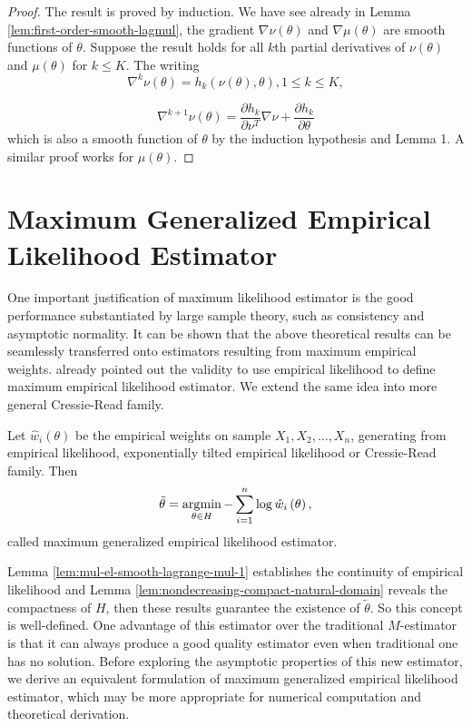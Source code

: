 \begin{proof}
The result is proved by induction. We have see already in Lemma \ref{lem:first-order-smooth-lagmul},
the gradient $\nabla\nu\left(\theta\right)$ and $\nabla\mu\left(\theta\right)$
are smooth functions of $\theta$. Suppose the result holds for all
$k$th partial derivatives of $\nu\left(\theta\right)$ and $\mu\left(\theta\right)$
for $k\le K$. The writing 
\[
\nabla^{k}\nu\left(\theta\right)=h_{k}\left(\nu\left(\theta\right),\theta\right),1\le k\le K,
\]
 
\[
\nabla^{k+1}\nu\left(\theta\right)=\frac{\partial h_{k}}{\partial\nu^{T}}\nabla\nu+\frac{\partial h_{k}}{\partial\theta}
\]
which is also a smooth function of $\theta$ by the induction hypothesis
and Lemma 1. A similar proof works for $\mu\left(\theta\right)$.
\end{proof}

\section{Maximum Generalized Empirical Likelihood Estimator}

One important justification of maximum likelihood estimator is the
good performance substantiated by large sample theory, such as consistency
and asymptotic normality. It can be shown that the above theoretical results
can be seamlessly transferred onto estimators resulting from maximum
empirical weights. \citet{qin1994empirical} already pointed out the
validity to use empirical likelihood to define maximum empirical likelihood
estimator. We extend the same idea into more general Cressie-Read
family. 
\begin{defn}
\label{def:gmele}Let $\hat{w}_{i}\left(\theta\right)$ be the empirical
weights on sample $X_{1},X_{2},\ldots,X_{n}$, generating from empirical
likelihood, exponentially tilted empirical likelihood or Cressie-Read
family. Then 
\[
\tilde{\theta}=\operatorname*{\arg\!\min}_{\theta\in H}-\sum_{i=1}^{n}\log\hat{w}_{i}\left(\theta\right),
\]
called  maximum generalized empirical likelihood estimator.
\end{defn}
Lemma \ref{lem:mul-el-smooth-lagrange-mul-1} establishes the continuity
of empirical likelihood and Lemma \ref{lem:nondecreasing-compact-natural-domain}
reveals the compactness of $H$, then these results guarantee the
existence of $\tilde{\theta}$. So this concept is well-defined. One
advantage of this estimator over the traditional $M$-estimator is that
it can always produce a good quality estimator even when traditional
one has no solution. Before exploring the asymptotic properties of
this new estimator, we derive an equivalent formulation of  maximum
generalized empirical likelihood estimator, which may be more appropriate
for numerical computation and theoretical derivation. 


